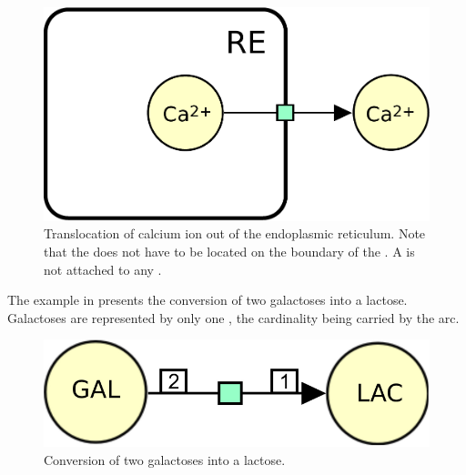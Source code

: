 \begin{figure}[H]
  \centering
  \includegraphics[scale = 0.3]{images/process-translocation}
  \caption{Translocation of calcium ion out of the endoplasmic reticulum. Note that the  does not have to be located on the boundary of the . A  is not attached to any .}
  \label{fig:trans-trans}
\end{figure}

The example in  presents the conversion of two galactoses into a lactose.  Galactoses are represented by only one , the cardinality being carried by the  arc.

\begin{figure}[H]
  \centering
  \includegraphics[scale = 0.3]{images/process-dimerisation}
  \caption{Conversion of two galactoses into a lactose.}
  \label{fig:trans-dim}
\end{figure}

